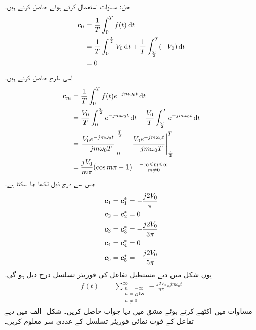 حل: مساوات  استعمال کرتے ہوئے   حاصل کرتے ہیں۔
\begin{align*}
\kx{c}_0&=\frac{1}{T}\int_0^{T} f(t) \dif t\\
&=\frac{1}{T}\int_0^{\frac{T}{2}} V_0 \dif t+\frac{1}{T}\int_{\frac{T}{2}}^{T}(-V_0)\dif t\\
&=0
\end{align*}
اسی طرح  حاصل کرتے ہیں۔
\begin{align*}
\kx{c}_m&=\frac{1}{T} \int_0^{T} f(t) e^{-jm\omega_0 t} \dif t\\
&=\frac{V_0}{T}\int_0^{\frac{T}{2}} e^{-jm\omega_0 t} \dif t-\frac{V_0}{T}\int_{\frac{T}{2}}^T e^{-jm\omega_0 t} \dif t\\
&=\left. \frac{V_0 e^{-jm\omega_0 t}}{-jm\omega_0 T}\right|_{0}^{\frac{T}{2}}-\left. \frac{V_0 e^{-jm\omega_0 t}}{-jm\omega_0 T}\right|_{\frac{T}{2}}^{T}\\
&=\frac{jV_0}{m\pi}(\cos m\pi -1)\quad \substack{-\infty \le m \le \infty\\ m \ne 0}
\end{align*}
جس سے درج ذیل لکھا جا سکتا ہے۔
\begin{align*}
{\ensuremath{{\boldsymbol{c}}}}_1&={{\boldsymbol{c}}}^*_1=-\frac{j2V_0}{\pi}\\
{{\boldsymbol{c}}}_2&={{\boldsymbol{c}}}^*_2=0\\
{{\boldsymbol{c}}}_3&={{\boldsymbol{c}}}^*_3=-\frac{j2V_0}{3\pi}\\
{{\boldsymbol{c}}}_4&={{\boldsymbol{c}}}^*_4=0\\
{{\boldsymbol{c}}}_5&={{\boldsymbol{c}}}^*_5=-\frac{j2V_0}{5\pi}
\end{align*}
یوں شکل میں دیے مستطیل تفاعل کی فوریئر تسلسل درج ذیل ہو گی۔
\begin{align} \label{مساوات_فوریئر_مستطیل_دوسرا_جواب}
f(t)&=\sum_{\substack{n=-\infty \\ n=\text{طاق}\\ n \ne 0} }^{\infty} -\frac{j2V_0}{n\pi}e^{jn\omega_0 t}
\end{align}
مساوات  میں  اکٹھے کرتے ہوئے مشق  میں دیا جواب حاصل کریں۔
شکل -الف میں دیے تفاعل کے قوت نمائی فوریئر تسلسل کے عددی سر معلوم کریں۔
